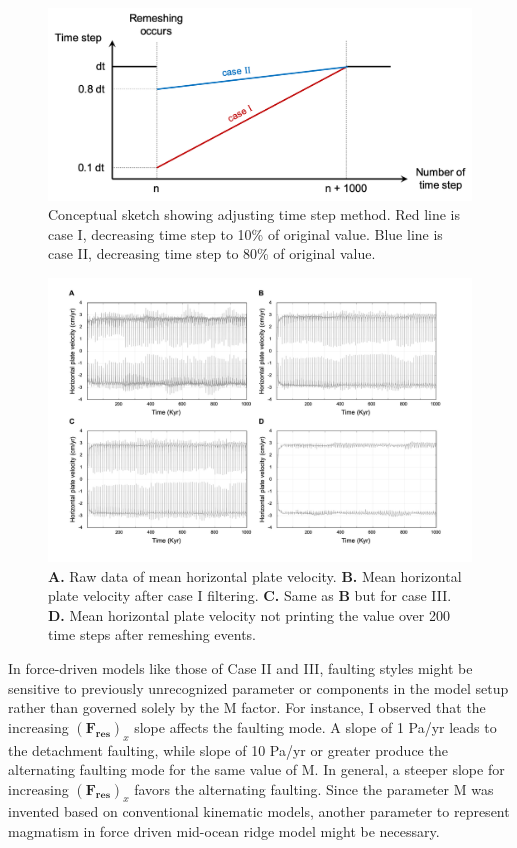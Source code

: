\documentclass[letterpaper,12pt,notitle]{memphisthesis}                     %
\begin{document}
\begin{figure}[!htb]
	\centering
	\includegraphics[width=0.8\linewidth]{./figs/dtadjust.png}
	\caption{Conceptual sketch showing adjusting time step method. Red line is case I, decreasing time step to 10\% of original value. Blue line is case II, decreasing time step to 80\% of original value.}
	\label{fig:dtadj}
\end{figure}
%
\begin{figure}[!htb]
	\centering
	\includegraphics[width=0.98\linewidth,trim=4 4 4 4,clip]{./figs/remeshing.png}
	\caption{\textbf{A.} Raw data of mean horizontal plate velocity. \textbf{B.} Mean horizontal plate velocity after case I filtering. \textbf{C.} Same as \textbf{B} but for case III. \textbf{D.} Mean horizontal plate velocity not printing the value over 200 time steps after remeshing events.}
	\label{fig:remeshing}
\end{figure}

In force-driven models like those of Case II and III, faulting styles might be sensitive to previously unrecognized parameter or components in the model setup rather than governed solely by the M factor. For instance, I observed that the increasing $(\boldsymbol{F_{res}})_x$ slope affects the faulting mode. A slope of 1 Pa/yr leads to the detachment faulting, while slope of 10 Pa/yr or greater produce the alternating faulting mode for the same value of M. In general, a steeper slope for increasing $(\boldsymbol{F_{res}})_x$ favors the alternating faulting. Since the parameter M was invented based on conventional kinematic models, another parameter to represent magmatism in force driven mid-ocean ridge model might be necessary.
\end{document}
